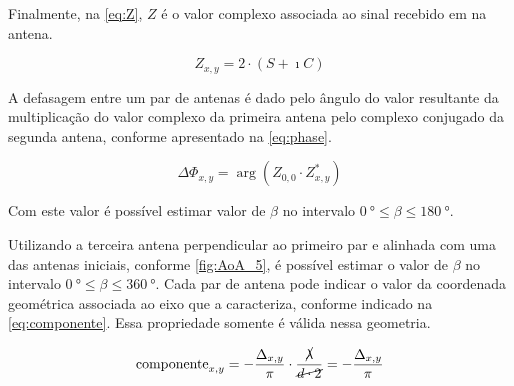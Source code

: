 Finalmente, na \autoref{eq:Z}, $Z$ é o valor complexo associada ao sinal recebido em na antena.

\begin{equation}\label{eq:Z}
    Z_{x,y} = 2\cdot(S + \imath C)
\end{equation}

A defasagem entre um par de antenas é dado pelo ângulo do valor resultante da multiplicação do valor complexo da primeira antena pelo complexo conjugado da segunda antena, conforme apresentado na \autoref{eq:phase}.

\begin{equation}\label{eq:phase}
    \Delta\Phi_{x,y} = \arg(Z_{0,0}\cdot Z^*_{x,y})
\end{equation}

Com este valor é possível estimar valor de $\beta$ no intervalo $\SI{0}{\degree} \leq \beta \leq \SI{180}{\degree}$.

Utilizando a terceira antena perpendicular ao primeiro par e alinhada com uma das antenas iniciais, conforme \autoref{fig:AoA_5}, é possível estimar o valor de $\beta$ no intervalo $\SI{0}{\degree} \leq \beta \leq \SI{360}{\degree}$.
Cada par de antena pode indicar o valor da coordenada geométrica associada ao eixo que a caracteriza, conforme indicado na \autoref{eq:componente}.
Essa propriedade somente é válida nessa geometria.

\begin{equation}\label{eq:componente}
    \text{componente}_{x,y} = -\frac{\Delta_{x,y}}{\pi}\cdot\frac{\cancel{\lambda}}{\cancel{d \cdot 2}} = -\frac{\Delta_{x,y}}{\pi}
\end{equation}
